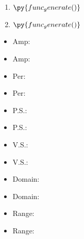 \documentclass{article}
\begin{document}
\begin{multicols}{2}
\begin{enumerate}
    \item $\py{func_generate()}$
    \item $\py{func_generate()}$
\end{enumerate}
\end{multicols}
\vspace{0.1cm}
\begin{multicols}{2}
    \begin{itemize}
        \item Amp: \makebox[2in]{\hrulefill}
        \item Amp: \makebox[2in]{\hrulefill}
    \end{itemize}
\end{multicols}
\vspace{0.1cm}
\begin{multicols}{2}
    \begin{itemize}
        \item Per: \makebox[2in]{\hrulefill}
        \item Per: \makebox[2in]{\hrulefill}
    \end{itemize}
\end{multicols}
\vspace{0.1cm}
\begin{multicols}{2}
    \begin{itemize}
        \item P.S.: \makebox[2in]{\hrulefill}
        \item P.S.: \makebox[2in]{\hrulefill}
    \end{itemize}
\end{multicols}
\vspace{0.1cm}
\begin{multicols}{2}
    \begin{itemize}
        \item V.S.: \makebox[2in]{\hrulefill}
        \item V.S.: \makebox[2in]{\hrulefill}
    \end{itemize}
\end{multicols}
\vspace{0.1cm}
\begin{multicols}{2}
    \begin{itemize}
        \item Domain: \makebox[2in]{\hrulefill}
        \item Domain: \makebox[2in]{\hrulefill}
    \end{itemize}
\end{multicols}
\vspace{0.1cm}
\begin{multicols}{2}
    \begin{itemize}
        \item Range: \makebox[2in]{\hrulefill}
        \item Range: \makebox[2in]{\hrulefill}
    \end{itemize}
\end{multicols}
\end{document}

